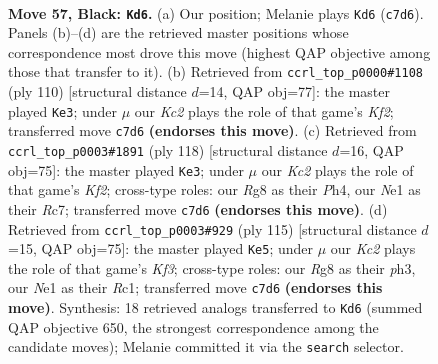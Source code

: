 \documentclass[11pt]{article}
\begin{document}
\clearpage

\begin{figure}[p]\centering
\begin{subfigure}{0.46\textwidth}\centering
\resizebox{\linewidth}{!}{%
\newchessgame
\chessboard[
  setfen={6r1/p1k4R/Pp6/1B3p2/5P2/4K3/8/4n3 b - - 6 57},
  showmover=false,
  pgfstyle=straightmove, color=movearrow, markmove={c7-d6}
]}
\caption{}
\end{subfigure}\hfill
\begin{subfigure}{0.46\textwidth}\centering
\resizebox{\linewidth}{!}{%
\newchessgame
\chessboard[
  setfen={3R4/8/5k2/4p3/4P2p/5P1P/r4K2/8 w - - 8 56},
  showmover=false,
  pgfstyle=straightmove, color=movearrow, markmove={f2-e3}
]}
\caption{}
\end{subfigure}
\\[4pt]
\begin{subfigure}{0.46\textwidth}\centering
\resizebox{\linewidth}{!}{%
\newchessgame
\chessboard[
  setfen={8/2R5/5kp1/8/5PpP/6P1/r4K2/8 w - - 22 60},
  showmover=false,
  pgfstyle=straightmove, color=movearrow, markmove={f2-e3}
]}
\caption{}
\end{subfigure}\hfill
\begin{subfigure}{0.46\textwidth}\centering
\resizebox{\linewidth}{!}{%
\newchessgame
\chessboard[
  setfen={8/8/R4kpp/8/4Pp2/7P/5KP1/2r5 b - - 4 58},
  showmover=false,
  pgfstyle=straightmove, color=movearrow, markmove={f6-e5}
]}
\caption{}
\end{subfigure}
\caption{\textbf{Move 57, Black: \texttt{Kd6}.} (a) Our position; Melanie plays \texttt{Kd6} (\texttt{c7d6}). Panels (b)--(d) are the retrieved master positions whose correspondence most drove this move (highest QAP objective among those that transfer to it). (b) Retrieved from \texttt{ccrl\_top\_p0000\#1108} (ply 110) [structural distance $d$=14, QAP obj=77]: the master played \texttt{Ke3}; under $\mu$ our \emph{Kc2} plays the role of that game's \emph{Kf2}; transferred move \texttt{c7d6} \textbf{(endorses this move)}. (c) Retrieved from \texttt{ccrl\_top\_p0003\#1891} (ply 118) [structural distance $d$=16, QAP obj=75]: the master played \texttt{Ke3}; under $\mu$ our \emph{Kc2} plays the role of that game's \emph{Kf2}; cross-type roles: our \emph{R}g8 as their \emph{P}h4, our \emph{N}e1 as their \emph{R}c7; transferred move \texttt{c7d6} \textbf{(endorses this move)}. (d) Retrieved from \texttt{ccrl\_top\_p0003\#929} (ply 115) [structural distance $d$=15, QAP obj=75]: the master played \texttt{Ke5}; under $\mu$ our \emph{Kc2} plays the role of that game's \emph{Kf3}; cross-type roles: our \emph{R}g8 as their \emph{p}h3, our \emph{N}e1 as their \emph{R}c1; transferred move \texttt{c7d6} \textbf{(endorses this move)}. Synthesis: 18 retrieved analogs transferred to \texttt{Kd6} (summed QAP objective 650, the strongest correspondence among the candidate moves); Melanie committed it via the \texttt{search} selector.}
\label{fig:thought-m113}
\end{figure}
\end{document}
